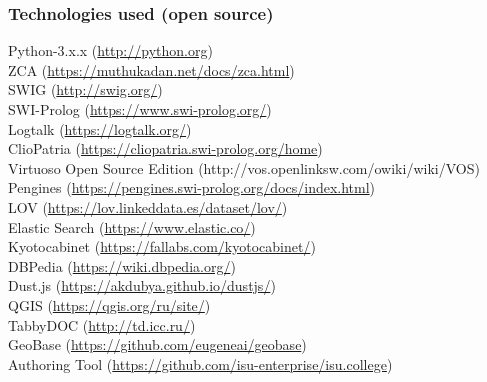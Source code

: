\documentclass[10pt]{beamer}
\begin{document}
\begin{frame}
  \frametitle{Technologies used (open source)}
  Python-3.x.x (\url{http://python.org})\\
  ZCA (\url{https://muthukadan.net/docs/zca.html})\\
  SWIG (\url{http://swig.org/})\\
  SWI-Prolog (\url{https://www.swi-prolog.org/})\\
  Logtalk (\url{https://logtalk.org/})\\
  ClioPatria (\url{https://cliopatria.swi-prolog.org/home})\\
  Virtuoso Open Source Edition (http://vos.openlinksw.com/owiki/wiki/VOS)\\
  Pengines (\url{https://pengines.swi-prolog.org/docs/index.html})\\
  LOV (\url{https://lov.linkeddata.es/dataset/lov/})\\
  Elastic Search (\url{https://www.elastic.co/})\\
  Kyotocabinet (\url{https://fallabs.com/kyotocabinet/})\\
  DBPedia (\url{https://wiki.dbpedia.org/})\\
  Dust.js (\url{https://akdubya.github.io/dustjs/})\\
  QGIS (\url{https://qgis.org/ru/site/})\\
  TabbyDOC (\url{http://td.icc.ru/})\\
  GeoBase (\url{https://github.com/eugeneai/geobase})\\
  Authoring Tool (\url{https://github.com/isu-enterprise/isu.college})
\end{frame}
\end{document}
